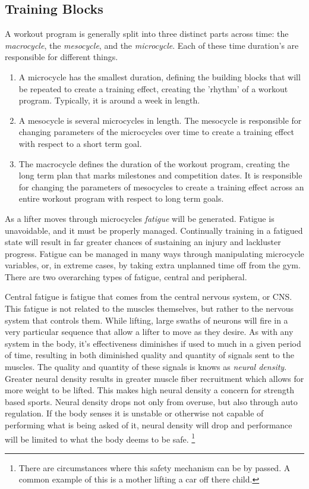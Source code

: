 \subsection{Training Blocks}
\label{sec:P1_TrainingBlocks}

A workout program is generally split into three distinct parts across time: the \textit{macrocycle}, the \textit{mesocycle}, and the \textit{microcycle}. Each of these time duration's are responsible for different things.

\begin{enumerate}
	\item A microcycle has the smallest duration, defining the building blocks that will be repeated to create a training effect, creating the 'rhythm' of a workout program. Typically, it is around  a week in length. 
	\item A mesocycle is several microcycles in length. The mesocycle is responsible for changing parameters of the microcycles over time to create a training effect with respect to a short term goal.
	\item The macrocycle defines the duration of the workout program, creating the long term plan that marks milestones and competition dates. It is responsible for changing the parameters of mesocycles to create a training effect across an entire workout program with respect to long term goals.
\end{enumerate}

As a lifter moves through microcycles \textit{fatigue} will be generated. Fatigue is unavoidable, and it must be properly managed. Continually training in a fatigued state will result in far greater chances of sustaining an injury and lackluster progress. Fatigue can be managed in many ways through manipulating microcycle variables, or, in extreme cases, by taking extra unplanned time off from the gym. There are two overarching types of fatigue, central and peripheral.\cite{MEASURING_FATIGUE}

Central fatigue is fatigue that comes from the central nervous system, or CNS. This fatigue is not related to the muscles themselves, but rather to the nervous system that controls them. While lifting, large swaths of neurons will fire in a very particular sequence that allow a lifter to move as they desire. As with any system in the body, it's effectiveness diminishes if used to much in a given period of time, resulting in both diminished quality and quantity of signals sent to the muscles. The quality and quantity of these signals is knows as \textit{neural density}. Greater neural density results in greater muscle fiber recruitment which allows for more weight to be lifted. This makes high neural density a concern for strength based sports. Neural density drops not only from overuse, but also through auto regulation. If the body senses it is unstable or otherwise not capable of performing what is being asked of it, neural density will drop and performance will be limited to what the body deems to be safe. \footnote{There are circumstances where this safety mechanism can be by passed. A common example of this is a mother lifting a car off there child.} \cite{MEASURING_FATIGUE}

